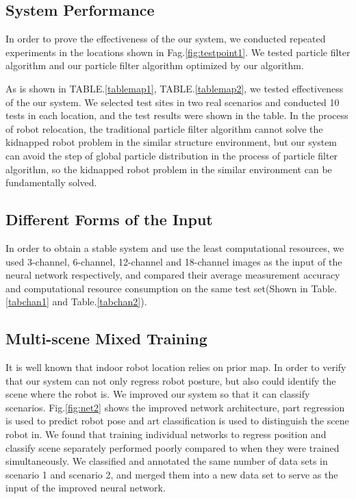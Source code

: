 \documentclass[journal]{IEEEtran}
\begin{document}
\subsection{System Performance}

In order to prove the effectiveness of the our system, we conducted repeated experiments in the locations shown in Fag.\ref{fig:testpoint1}. We tested particle filter algorithm and our  particle filter algorithm optimized by our algorithm. 

As is shown in TABLE.\ref{tablemap1}, TABLE.\ref{tablemap2}, we tested effectiveness of the our system. We selected test sites in two real scenarios and conducted 10 tests in each location, and the test results were shown in the table. In the process of robot relocation, the traditional particle filter algorithm cannot solve the kidnapped robot problem in the similar structure environment, but our system can avoid the step of global particle distribution in the process of particle filter algorithm, so the kidnapped robot problem in the similar environment can be fundamentally solved.



\subsection{Different Forms of the Input}

In order to obtain a stable system and use the least computational resources, we used 3-channel, 6-channel, 12-channel and 18-channel images as the input of the neural network respectively, and compared their average measurement accuracy and computational resource consumption on the same test set(Shown in Table.\ref{tabchan1} and Table.\ref{tabchan2}).


\subsection{Multi-scene Mixed Training}

It is well known that indoor robot location relies on prior map. In order to verify that our system can not only  regress  robot posture, but also could identify the scene where the robot is. We  improved  our system so that it can classify scenarios. Fig.\ref{fig:net2} shows the improved network architecture,  part regression is used to predict robot pose and art classification is used to distinguish the scene robot in. We found that training individual networks to regress position and classify scene separately performed poorly compared to when they were trained simultaneously. We classified and annotated the same number of data sets in scenario 1 and scenario 2, and merged them into a new data set to serve as the input of the improved neural network.
\end{document}

